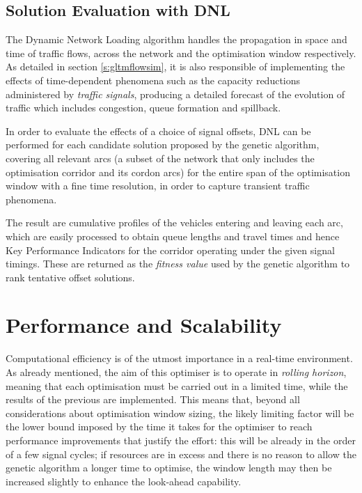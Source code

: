 \subsection{Solution Evaluation with DNL}
The Dynamic Network Loading algorithm handles the propagation in space and time of traffic flows, across the network and the optimisation window respectively. As detailed in section \ref{s:gltmflowsim}, it is also responsible of implementing the effects of time-dependent phenomena such as the capacity reductions administered by \emph{traffic signals}, producing a detailed forecast of the evolution of traffic which includes congestion, queue formation and spillback.

In order to evaluate the effects of a choice of signal offsets, DNL can be performed for each candidate solution proposed by the genetic algorithm, covering all relevant arcs (a subset of the network that only includes the optimisation corridor and its cordon arcs) for the entire span of the optimisation window with a fine time resolution, in order to capture transient traffic phenomena.

The result are cumulative profiles of the vehicles entering and leaving each arc, which are easily processed to obtain queue lengths and travel times and hence Key Performance Indicators for the corridor operating under the given signal timings. These are returned as the \emph{fitness value} used by the genetic algorithm to rank tentative offset solutions.

\section{Performance and Scalability}
Computational efficiency is of the utmost importance in a real-time environment.
As already mentioned, the aim of this optimiser is to operate in \emph{rolling horizon}, meaning that each optimisation must be carried out in a limited time, while the results of the previous are implemented. This means that, beyond all considerations about optimisation window sizing, the likely limiting factor will be the lower bound imposed by the time it takes for the optimiser to reach performance improvements that justify the effort: this will be already in the order of a few signal cycles; if resources are in excess and there is no reason to allow the genetic algorithm a longer time to optimise, the window length may then be increased slightly to enhance the look-ahead capability.

